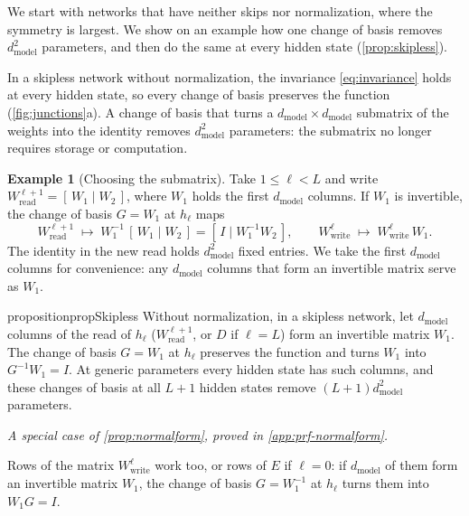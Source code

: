\documentclass[10pt]{article}
\theoremstyle{definition}
\newtheorem*{example*}{Example}
\theoremstyle{remark}
\newcommand{\Wread}{W_{\mathrm{read}}}
\newcommand{\Wwrite}{W_{\mathrm{write}}}
\newcommand{\dm}{d_{\mathrm{model}}}
\newcommand{\specialof}[2]{\par\vspace{-0.4\baselineskip}\noindent\hfill{\small\itshape A special case of \cref{#1}, proved in \cref{#2}.}\par\smallskip}
\begin{document}
We start with networks that have neither skips nor normalization, where the symmetry is largest. We show on an example how one change of basis removes $\dm^2$ parameters, and then do the same at every hidden state (\cref{prop:skipless}).

In a skipless network without normalization, the invariance \eqref{eq:invariance} holds at every hidden state, so every change of basis preserves the function (\cref{fig:junctions}a). A change of basis that turns a $\dm\times\dm$ submatrix of the weights into the identity removes $\dm^2$ parameters: the submatrix no longer requires storage or computation.

\begin{example*}[Choosing the submatrix]
Take $1 \le \ell < L$ and write $\Wread^{\ell+1} = [\,W_1 \mid W_2\,]$, where $W_1$ holds the first $\dm$ columns. If $W_1$ is invertible, the change of basis $G = W_1$ at $h_\ell$ maps
\[
\Wread^{\ell+1} \;\mapsto\; W_1^{-1}\,[\,W_1 \mid W_2\,] = [\,I \mid W_1^{-1}W_2\,], \qquad \Wwrite^{\ell} \;\mapsto\; \Wwrite^{\ell}\,W_1 .
\]
The identity in the new read holds $\dm^2$ fixed entries. We take the first $\dm$ columns for convenience: any $\dm$ columns that form an invertible matrix serve as $W_1$.
\end{example*}

\begin{restatable}{proposition}{propSkipless}\label{prop:skipless}
Without normalization, in a skipless network, let $\dm$ columns of the read of $h_\ell$ ($\Wread^{\ell+1}$, or $D$ if $\ell = L$) form an invertible matrix $W_1$. The change of basis $G = W_1$ at $h_\ell$ preserves the function and turns $W_1$ into $G^{-1}W_1 = I$. At generic parameters every hidden state has such columns, and these changes of basis at all $L+1$ hidden states remove $(L+1)\dm^2$ parameters.
\end{restatable}
\specialof{prop:normalform}{app:prf-normalform}

Rows of the matrix $\Wwrite^{\ell}$ work too, or rows of $E$ if $\ell = 0$: if $\dm$ of them form an invertible matrix $W_1$, the change of basis $G = W_1^{-1}$ at $h_\ell$ turns them into $W_1G = I$.
\end{document}
